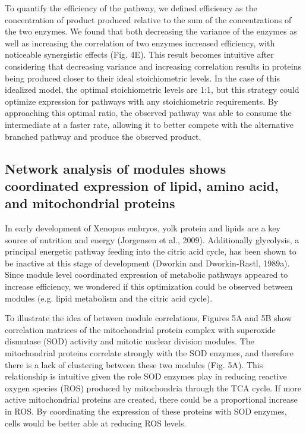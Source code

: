 To quantify the efficiency of the pathway, we defined efficiency as the concentration of product produced relative to the sum of the concentrations of the two enzymes. We found that both decreasing the variance of the enzymes as well as increasing the correlation of two enzymes increased efficiency, with noticeable synergistic effects (Fig. 4E). This result becomes intuitive after considering that decreasing variance and increasing correlation results in proteins being produced closer to their ideal stoichiometric levels. In the case of this idealized model, the optimal stoichiometric levels are 1:1, but this strategy could optimize expression for pathways with any stoichiometric requirements. By approaching this optimal ratio, the observed pathway was able to consume the intermediate at a faster rate, allowing it to better compete with the alternative branched pathway and produce the observed product.

\subsection{Network analysis of modules shows coordinated expression of lipid, amino acid, and mitochondrial proteins}

In early development of Xenopus embryos, yolk protein and lipids are a key source of nutrition and energy (Jorgensen et al., 2009). Additionally glycolysis, a principal energetic pathway feeding into the citric acid cycle, has been shown to be inactive at this stage of development (Dworkin and Dworkin-Rastl, 1989a). Since module level coordinated expression of metabolic pathways appeared to increase efficiency, we wondered if this optimization could be observed between modules (e.g. lipid metabolism and the citric acid cycle).

To illustrate the idea of between module correlations, Figures 5A and 5B show correlation matrices of the mitochondrial protein complex with superoxide dismutase (SOD) activity and mitotic nuclear division modules. The mitochondrial proteins correlate strongly with the SOD enzymes, and therefore there is a lack of clustering between these two modules (Fig. 5A). This relationship is intuitive given the role SOD enzymes play in reducing reactive oxygen species (ROS) produced by mitochondria through the TCA cycle. If more active mitochondrial proteins are created, there could be a proportional increase in ROS. By coordinating the expression of these proteins with SOD enzymes, cells would be better able at reducing ROS levels.

